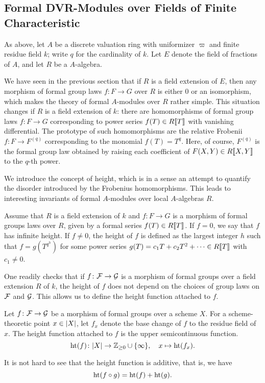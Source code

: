 \documentclass[../main.tex]{subfiles}
\begin{document}
\subsection{Formal DVR-Modules over Fields of Finite Characteristic} %
\label{sub:Formal DVR-Modules over Fields}
As above, let $A$ be a discrete valuation ring with uniformizer $\varpi$ and finite 
residue field $k$; write $q$ for the cardinality of $k$. Let $E$ denote the
field of fractions of $A$, and let $R$ be a $A$-algebra. 

We have seen in the previous section that if $R$ is a field extension of $E$,
then any morphism of formal group laws $f\colon  F \to G$ over $R$ is either $0$
or an isomorphism, which makes the theory of formal $A$-modules over $R$ rather
simple. This situation changes if $R$ is a field extension of $k$: there are
homomorphisms of formal group laws $f\colon F \to G$ corresponding to power
series $f(T) \in R \llbracket T \rrbracket$ with vanishing differential. The prototype of
such homomorphisms are the relative Frobenii $f \colon F \to F^{(q)}$ corresponding
to the monomial $f(T) = T^q$. Here, of course, $F^{(q)}$ is the formal group
law obtained by raising each coefficient of $F(X,Y) \in R\llbracket X, Y\rrbracket$ to
the $q$-th power.

We introduce the concept of height, which is in a sense an attempt to quantify
the disorder introduced by the Frobenius homomorphisms. This leads to
interesting invariants of formal $A$-modules over local $A$-algebras $R$.

\begin{defi}
  Assume that $R$ is a field extension of $k$ and $f\colon  F \to G$ is a morphism of 
  formal groups laws over $R$, given by a formal series $f(T) \in R\llbracket T \rrbracket$. 
  If $f = 0$, we say that $f$ has infinite height. 
  If $f \neq 0$, the height of $f$ is defined as the largest integer $h$ such that 
  $f = g(T^{q^h})$ for some power series $g(T) = c_1 T + c_2 T^2 + \dots \in
  R\llbracket T \rrbracket$ with $c_1 \neq 0$. 
\end{defi}
One readily checks that if $f\colon  \mathcal{F} \to \mathcal{G}$ is a morphism of formal groups over
a field extension $R$ of $k$, the height of $f$ does not depend on the choices
of group laws on $\mathcal{F}$ and $\mathcal{G}$. This allows us to define the height function 
attached to $f$. 
\begin{defi}
  Let $f\colon  \mathcal{F} \to \mathcal{G}$ be a morphism of formal groups over a scheme $X$.
  For a scheme-theoretic point $x \in \lvert X \rvert$, let $f_x$ denote the base change of $f$ to the residue field of $x$. 
  The height function attached to $f$ is the upper semicontinuous function.
  \begin{equation} \label{eq:defheight}
    \textnormal{ht}(f) \colon  \lvert X \rvert \to \mathbb{Z}_{\geq 0} \cup \{\infty\}, \quad x \mapsto 
    \textnormal{ht}(f_x).
  \end{equation}
\end{defi}
It is not hard to see that the height function is additive, that is, we have
\begin{equation*}
  \textnormal{ht}(f \circ g) = \textnormal{ht}(f) + \textnormal{ht}(g).
\end{equation*}
\end{document}
